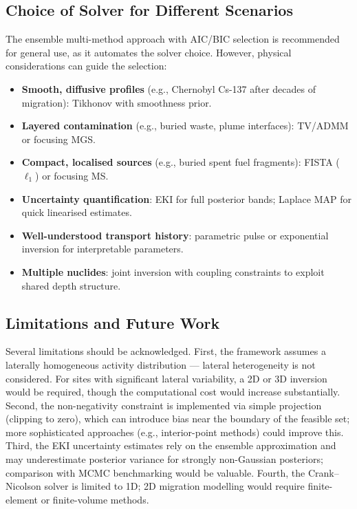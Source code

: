 \documentclass[a4paper,11pt]{article}
\begin{document}
\subsection{Choice of Solver for Different Scenarios}

The ensemble multi-method approach with AIC/BIC selection is recommended
for general use, as it automates the solver choice.  However, physical
considerations can guide the selection:

\begin{itemize}
  \item \textbf{Smooth, diffusive profiles} (e.g., Chernobyl Cs-137
  after decades of migration): Tikhonov with smoothness prior.
  \item \textbf{Layered contamination} (e.g., buried waste, plume
  interfaces): TV/ADMM or focusing MGS.
  \item \textbf{Compact, localised sources} (e.g., buried spent fuel
  fragments): FISTA ($\ell_1$) or focusing MS.
  \item \textbf{Uncertainty quantification}: EKI for full posterior
  bands; Laplace MAP for quick linearised estimates.
  \item \textbf{Well-understood transport history}: parametric pulse
  or exponential inversion for interpretable parameters.
  \item \textbf{Multiple nuclides}: joint inversion with coupling
  constraints to exploit shared depth structure.
\end{itemize}

\subsection{Limitations and Future Work}

Several limitations should be acknowledged.  First, the framework
assumes a laterally homogeneous activity distribution --- lateral
heterogeneity is not considered.  For sites with significant lateral
variability, a 2D or 3D inversion would be required, though the
computational cost would increase substantially.  Second, the
non-negativity constraint is implemented via simple projection
(clipping to zero), which can introduce bias near the boundary of
the feasible set; more sophisticated approaches (e.g., interior-point
methods) could improve this.  Third, the EKI uncertainty estimates
rely on the ensemble approximation and may underestimate posterior
variance for strongly non-Gaussian posteriors; comparison with MCMC
benchmarking would be valuable.  Fourth, the Crank--Nicolson solver is
limited to 1D; 2D migration modelling would require finite-element or
finite-volume methods.
\end{document}
